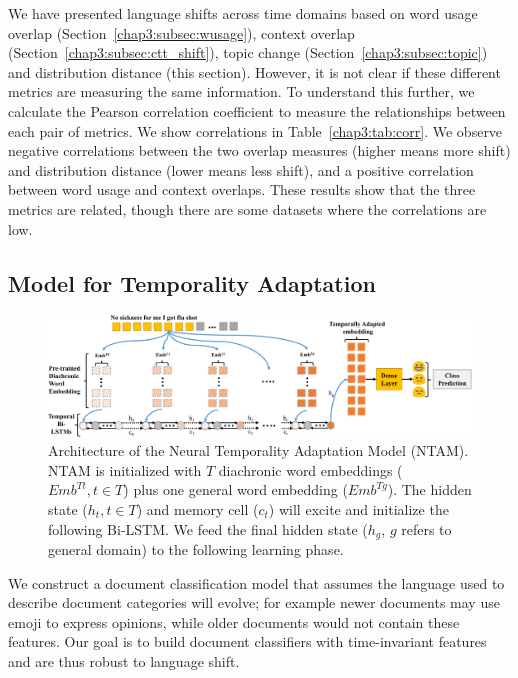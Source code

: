 We have presented language shifts across time domains based on word usage overlap (Section~\ref{chap3:subsec:wusage}), context overlap (Section~\ref{chap3:subsec:ctt_shift}), topic change (Section~\ref{chap3:subsec:topic}) and distribution distance (this section). However, it is not clear if these different metrics are measuring the same information. To understand this further, we calculate the Pearson correlation coefficient to measure the relationships between each pair of metrics. 
We show correlations in Table~\ref{chap3:tab:corr}. We observe negative correlations between the two overlap measures (higher means more shift) and distribution distance (lower means less shift),
and a positive correlation between word usage and context overlaps.
These results show that the three metrics are related, though there are some datasets where the correlations are low.


\subsection{Model for Temporality Adaptation}
\label{chap3:sec:model}

\begin{figure}[tb!]
\centering
\includegraphics[scale=0.47]{./images/chapter3/model.pdf}
\caption{Architecture of the Neural Temporality Adaptation Model (NTAM). 
NTAM is initialized with $T$ diachronic word embeddings ($Emb^{Tt}, t\in T$) plus one general word embedding ($Emb^{Tg}$). The hidden state ($h_t, t\in T$) and memory cell ($c_t$) will excite and initialize the following Bi-LSTM. We feed the final hidden state ($h_g$, $g$ refers to general domain) to the following learning phase.}
\label{chap3:fig:model}
\end{figure}

We construct a document classification model that assumes the language used to describe document categories will evolve; for example newer documents may use emoji to express opinions, while older documents would not contain these features.
Our goal is to build document classifiers with time-invariant features and are thus robust to language shift. 

